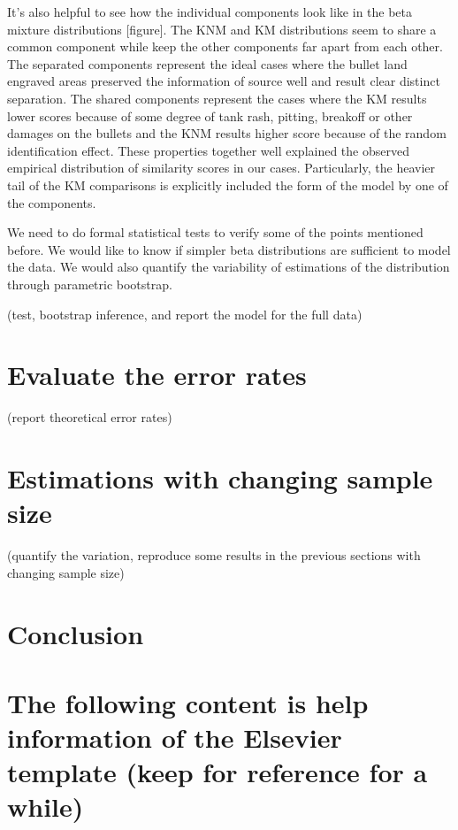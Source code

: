 \documentclass[]{elsarticle} %
\begin{document}
It's also helpful to see how the individual components look like in the
beta mixture distributions {[}figure{]}. The KNM and KM distributions
seem to share a common component while keep the other components far
apart from each other. The separated components represent the ideal
cases where the bullet land engraved areas preserved the information of
source well and result clear distinct separation. The shared components
represent the cases where the KM results lower scores because of some
degree of tank rash, pitting, breakoff or other damages on the bullets
and the KNM results higher score because of the random identification
effect. These properties together well explained the observed empirical
distribution of similarity scores in our cases. Particularly, the
heavier tail of the KM comparisons is explicitly included the form of
the model by one of the components.

We need to do formal statistical tests to verify some of the points
mentioned before. We would like to know if simpler beta distributions
are sufficient to model the data. We would also quantify the variability
of estimations of the distribution through parametric bootstrap.

(test, bootstrap inference, and report the model for the full data)

\hypertarget{evaluate-the-error-rates}{%
\section{Evaluate the error rates}\label{evaluate-the-error-rates}}

(report theoretical error rates)

\hypertarget{estimations-with-changing-sample-size}{%
\section{Estimations with changing sample
size}\label{estimations-with-changing-sample-size}}

(quantify the variation, reproduce some results in the previous sections
with changing sample size)

\hypertarget{conclusion}{%
\section{Conclusion}\label{conclusion}}

\hypertarget{the-following-content-is-help-information-of-the-elsevier-template-keep-for-reference-for-a-while}{%
\section{The following content is help information of the Elsevier
template (keep for reference for a
while)}\label{the-following-content-is-help-information-of-the-elsevier-template-keep-for-reference-for-a-while}}
\end{document}

